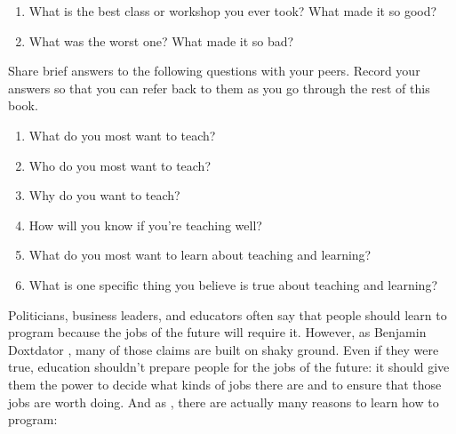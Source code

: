 \begin{enumerate}

\item
  What is the best class or workshop you ever took?
  What made it so good?

\item
  What was the worst one?
  What made it so bad?

\end{enumerate}


Share brief answers to the following questions with your peers.
Record your answers so that you can refer back to them
as you go through the rest of this book.

\begin{enumerate}

\item
  What do you most want to teach?

\item
  Who do you most want to teach?

\item
  Why do you want to teach?

\item
  How will you know if you're teaching well?

\item
  What do you most want to learn about teaching and learning?

\item
  What is one specific thing you believe is true about teaching and learning?

\end{enumerate}


Politicians, business leaders, and educators often say that
people should learn to program because the jobs of the future will require it.
However,
as Benjamin Doxtdator ,
many of those claims are built on shaky ground.
Even if they were true, education shouldn't prepare people for the jobs of the future:
it should give them the power to decide what kinds of jobs there are
and to ensure that those jobs are worth doing.
And as ,
there are actually many reasons to learn how to program:


